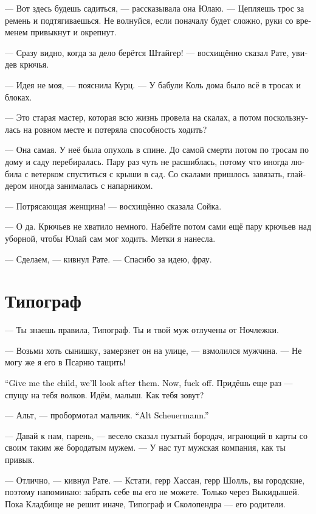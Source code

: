\documentclass[a4paper,12pt,fleqn]{book}\usepackage{cooltooltips}\usepackage{polyglossia}\setdefaultlanguage[babelshorthands=true]{russian}\setotherlanguage{english}\defaultfontfeatures{Ligatures=TeX,Mapping=tex-text} \usepackage{xcolor}\definecolor{lightgray}{HTML}{bbbbbb}\color{lightgray}\newcommand{\ml}[3]{\textenglish{\textcolor{black}{#3}}}
\begin{document}
--- Вот здесь будешь садиться, --- рассказывала она Юлаю.
--- Цепляешь трос за ремень и подтягиваешься.
Не волнуйся, если поначалу будет сложно, руки со временем привыкнут и окрепнут.

--- Сразу видно, когда за дело берётся Штайгер! --- восхищённо сказал Рате, увидев крючья.

--- Идея не моя, --- пояснила Курц.
--- У бабули Коль дома было всё в тросах и блоках.

--- Это старая мастер, которая всю жизнь провела на скалах, а потом поскользнулась на ровном месте и потеряла способность ходить?

--- Она самая.
У неё была опухоль в спине.
До самой смерти потом по тросам по дому и саду перебиралась.
Пару раз чуть не расшиблась, потому что иногда любила с ветерком спуститься с крыши в сад.
Со скалами пришлось завязать, глайдером иногда занималась с напарником.

--- Потрясающая женщина! --- восхищённо сказала Сойка.

--- О да.
Крючьев не хватило немного.
Набейте потом сами ещё пару крючьев над уборной, чтобы Юлай сам мог ходить.
Метки я нанесла.

--- Сделаем, --- кивнул Рате.
--- Спасибо за идею, фрау.

\section{Типограф}

--- Ты знаешь правила, Типограф.
Ты и твой муж отлучены от Ночлежки.

--- Возьми хоть сынишку, замерзнет он на улице, --- взмолился мужчина.
--- Не могу же я его в Псарню тащить!

\ml{$0$}
{--- Ребёнка давай сюда, мы позаботимся.}
{``Give me the child, we'll look after them.}
\ml{$0$}
{А теперь вали отсюда.}
{Now, fuck off.}
Придёшь еще раз --- спущу на тебя волков.
Идём, малыш.
Как тебя зовут?

--- Альт, --- пробормотал мальчик.
\ml{$0$}
{--- Альт Шоэрманн.}
{``Alt Scheuermann.''}

--- Давай к нам, парень, --- весело сказал пузатый бородач, играющий в карты со своим таким же бородатым мужем.
--- У нас тут мужская компания, как ты привык.

--- Отлично, --- кивнул Рате.
--- Кстати, герр Хассан, герр Шолль, вы городские, поэтому напоминаю: забрать себе вы его не можете.
Только через Выкидышей.
Пока Кладбище не решит иначе, Типограф и Сколопендра --- его родители.
\end{document}

